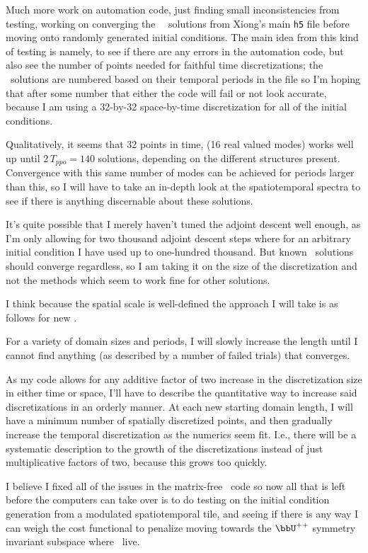 \begin{description}
{Much more work on automation code, just finding small inconsistencies
from testing, working on converging the \ppo\ \twot\ solutions from
Xiong's main \texttt{h5} file before moving onto randomly generated initial
conditions. The main idea from this kind of testing is namely,
to see if there are any errors in the automation code, but also see the
number of points needed for faithful time discretizations; the \ppo\ solutions
are numbered based on their temporal periods in the file so I'm hoping that
after some number that either the code will fail or not look accurate, because
I am using a 32-by-32 space-by-time discretization for all of the initial conditions.

Qualitatively, it seems that 32 points in time, (16 real valued modes) works well
up until $2\,T_{ppo}=140$ solutions, depending on the different structures present.
Convergence with this same number of modes can be achieved for periods larger than this,
so I will have to take an in-depth look at the spatiotemporal spectra to see if there is anything
discernable about these solutions.

It's quite possible that I merely haven't tuned the adjoint descent well enough, as I'm only
allowing for two thousand adjoint descent steps where for an arbitrary initial condition I have
used up to one-hundred thousand. But known \ppo\ solutions should converge regardless, so I
am taking it on the size of the discretization and not the methods which seem to work fine
for other solutions.

I think because the spatial scale is well-defined the approach I will take is as follows
for new {\twots}.

For a variety of domain sizes and periods, I will slowly increase the length until I cannot
find anything (as described by a number of failed trials) that converges.

As my code allows for any additive factor of two increase
in the discretization size in either time or space, I'll have to describe the quantitative
way to increase said discretizations in an orderly manner. At each new starting domain length,
I will have a minimum number of spatially discretized points, and then gradually increase the
temporal discretization as the numerics seem fit. I.e., there will be a systematic description
to the growth of the discretizations instead of just multiplicative factors of two, because
this grows too quickly.

I believe I fixed all of the issues in the matrix-free \rpo\ code so now all that is left
before the computers can take over is to do testing on the initial condition generation from
a modulated spatiotemporal tile, and  seeing
if there is any way I can weigh the cost functional to penalize moving towards the $\bbU^{++}$
symmetry invariant subspace where \eqva\ live.

}
\end{description}
